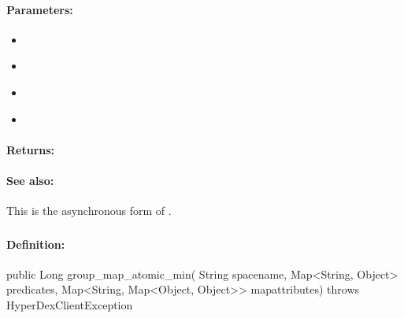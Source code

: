 \paragraph{Parameters:}
\begin{itemize}[noitemsep]
\item {}\\

\item {}\\

\item {}\\

\item {}\\

\end{itemize}

\paragraph{Returns:}


\paragraph{See also:}  This is the asynchronous form of .

\pagebreak
\subsubsection{}
\label{api:java:group_map_atomic_min}


\paragraph{Definition:}
\begin{javacode}
public Long group_map_atomic_min(
        String spacename,
        Map<String, Object> predicates,
        Map<String, Map<Object, Object>> mapattributes) throws HyperDexClientException
\end{javacode}

